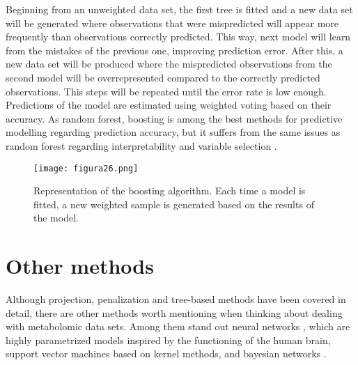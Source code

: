 Beginning from an unweighted data set, the first tree is fitted and a new data set will be generated where observations that were mispredicted will appear more frequently than observations correctly predicted. This way, next model will learn from the mistakes of the previous one, improving prediction error. After this, a new data set will be produced where the mispredicted observations from the second model will be overrepresented compared to the correctly predicted observations. This steps will be repeated until the error rate is low enough. Predictions of the model are estimated using weighted voting based on their accuracy. As random forest, boosting is among the best methods for predictive modelling regarding prediction accuracy, but it suffers from the same issues as random forest regarding interpretability and variable selection \parencite{auret2011empirical}.
\vspace{10pt}
\begin{figure}[hbtp]
\centering
\texttt{[image: figura26.png]}
\caption[Representation of the boosting algorithm]{Representation of the boosting algorithm. Each time a model is fitted, a new weighted sample is generated based on the results of the model.}
\label{figura26}
\end{figure}

\section{Other methods}
Although projection, penalization and tree-based methods have been covered in detail, there are other methods worth mentioning when thinking about dealing with metabolomic data sets. Among them stand out neural networks \parencite{dayhoff2001artificial}, which are highly parametrized models inspired by the functioning of the human brain, support vector machines \parencite{mahadevan2008analysis} based on kernel methods, and bayesian networks \parencite{bartel2013statistical}.